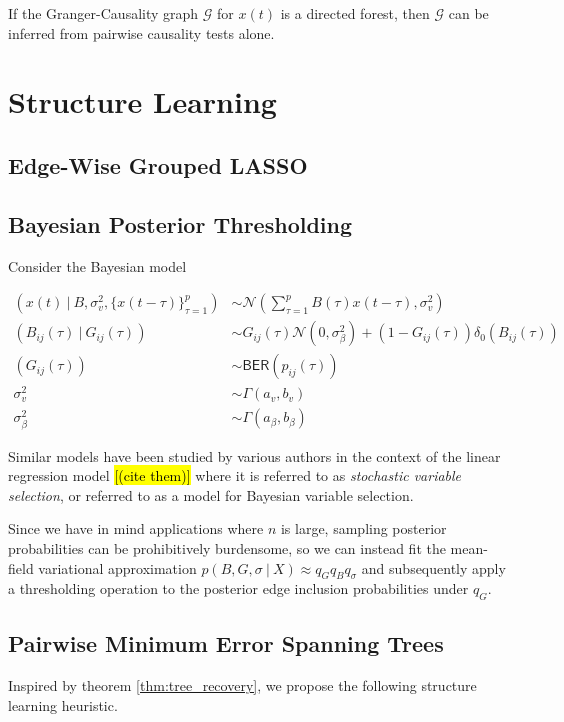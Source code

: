 \documentclass[12pt]{article}
\begin{document}
\begin{theorem}
  \label{thm:tree_recovery}
  If the Granger-Causality graph $\mathcal{G}$ for $x(t)$ is a
  directed forest, then $\mathcal{G}$ can be inferred from pairwise
  causality tests alone.
\end{theorem}

\section{Structure Learning}
\subsection{Edge-Wise Grouped LASSO}
\subsection{Bayesian Posterior Thresholding}
Consider the Bayesian model

\begin{equation}
  \begin{aligned}
    (x(t)\ |\ B, \sigma_v^2, \{x(t - \tau)\}_{\tau = 1}^p) &\sim \mathcal{N}(\sum_{\tau = 1}^pB(\tau)x(t - \tau), \sigma_v^2)\\
    (B_{ij}(\tau)\ |\ G_{ij}(\tau)) &\sim G_{ij}(\tau)\mathcal{N}(0, \sigma_\beta^2) + (1 - G_{ij}(\tau))\delta_0(B_{ij}(\tau))\\
    (G_{ij}(\tau)) &\sim \mathsf{BER}(p_{ij}(\tau))\\
    \sigma_v^2 &\sim \Gamma(a_v, b_v)\\
    \sigma_\beta^2 &\sim \Gamma(a_\beta, b_\beta)
  \end{aligned}
\end{equation}

Similar models have been studied by various authors in the context of the linear regression model \hl{[(cite them)]} where it is referred to as \textit{stochastic variable selection}, or referred to as a model for Bayesian variable selection.

Since we have in mind applications where $n$ is large, sampling posterior probabilities can be prohibitively burdensome, so we can instead fit the mean-field variational approximation $p(B, G, \sigma\ |\ X) \approx q_Gq_Bq_\sigma$ and subsequently apply a thresholding operation to the posterior edge inclusion probabilities under $q_G$.

\subsection{Pairwise Minimum Error Spanning Trees}
Inspired by theorem \ref{thm:tree_recovery}, we propose the following
structure learning heuristic.
\end{document}
